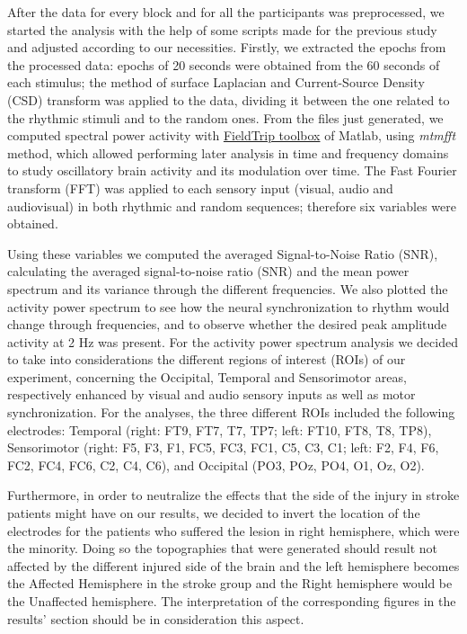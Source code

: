 After the data for every block and for all the participants was preprocessed, we started the analysis with the help of some scripts made for the previous study and adjusted according to our necessities. 
Firstly, we extracted the epochs from the processed data: epochs of 20 seconds were obtained from the 60 seconds of each stimulus; the method of surface Laplacian and Current-Source Density (CSD) transform was applied to the data, dividing it between the one related to the rhythmic stimuli and to the random ones. 
From the files just generated, we computed spectral power activity with \href{https://www.fieldtriptoolbox.org/}{FieldTrip toolbox} of Matlab, using \textit{mtmfft} method, which allowed performing later analysis in time and frequency domains to study oscillatory brain activity and its modulation over time. The Fast Fourier transform (FFT) was applied to each sensory input (visual, audio and audiovisual) in both rhythmic and random sequences; therefore six variables were obtained. 

Using these variables we computed the averaged Signal-to-Noise Ratio (SNR), calculating the averaged signal-to-noise ratio (SNR) and the mean power spectrum and its variance through the different frequencies. We also plotted the activity power spectrum to see how the neural synchronization to rhythm would change through frequencies, and to observe whether the desired peak amplitude activity at 2 Hz was present. 
For the activity power spectrum analysis we decided to take into considerations the different regions of interest (ROIs) of our experiment, concerning the Occipital, Temporal and Sensorimotor areas, respectively enhanced by visual and audio sensory inputs as well as motor synchronization. For the analyses, the three different ROIs included the following electrodes: Temporal (right: FT9, FT7, T7, TP7; left: FT10, FT8, T8, TP8), Sensorimotor (right: F5, F3, F1, FC5, FC3, FC1, C5, C3, C1; left: F2, F4, F6, FC2, FC4, FC6, C2, C4, C6), and Occipital (PO3, POz, PO4, O1, Oz, O2). 

Furthermore, in order to neutralize the effects that the side of the injury in stroke patients might have on our results, we decided to invert the location of the electrodes for the patients who suffered the lesion in right hemisphere, which were the minority. Doing so the topographies that were generated should result not affected by the different injured side of the brain and the left hemisphere becomes the Affected Hemisphere in the stroke group and the Right hemisphere would be the Unaffected hemisphere. The interpretation of the corresponding figures in the results' section should be in consideration this aspect.  


